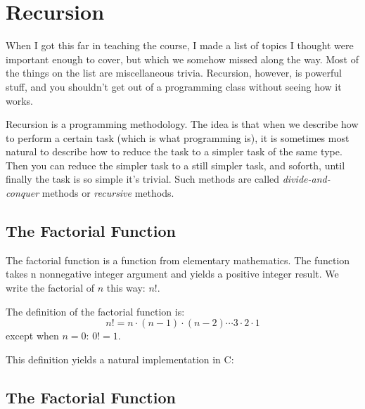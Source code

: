 \section{Recursion}

    When I got this far in teaching the course, I made a list of topics
I thought were important enough to cover, but which we somehow missed
along the way.  Most of the things on the list are miscellaneous trivia.
Recursion, however, is powerful stuff, and you shouldn't get out of a
programming class without seeing how it works.

Recursion is a programming methodology.  The idea is that when we
describe how to perform a certain task (which is what programming is),
it is sometimes most natural to describe how to reduce the task to a
simpler task of the same type.  Then you can reduce the simpler task to
a still simpler task, and soforth, until finally the task is so simple
it's trivial.  Such methods are called {\em divide-and-conquer}\/
methods or {\em recursive}\/ methods.

\subsection{The Factorial Function}

The factorial function is a function from elementary mathematics.  The
function takes n nonnegative integer argument and yields a positive
integer result.  We write the factorial of $n$ this way:  $n!$.  

The definition of the factorial function is: \[ n! = n \cdot (n-1) \cdot
(n-2) \cdots 3\cdot 2\cdot 1\] except when $n=0$:  $0! = 1$.

This definition yields a natural implementation in C:

\begin{flushleft}
\verb% long int fact(unsigned int n) % \\*
\verb% { % \\*
\verb%   long int total = 1; % \\*
\verb%  % \\*
\verb%   while (n>1)  % \\*
\verb%     total *= n--; % \\*
\verb%  % \\*
\verb%   return total; % \\*
\verb% } % 
\end{flushleft}

\subsection{The Factorial Function}

